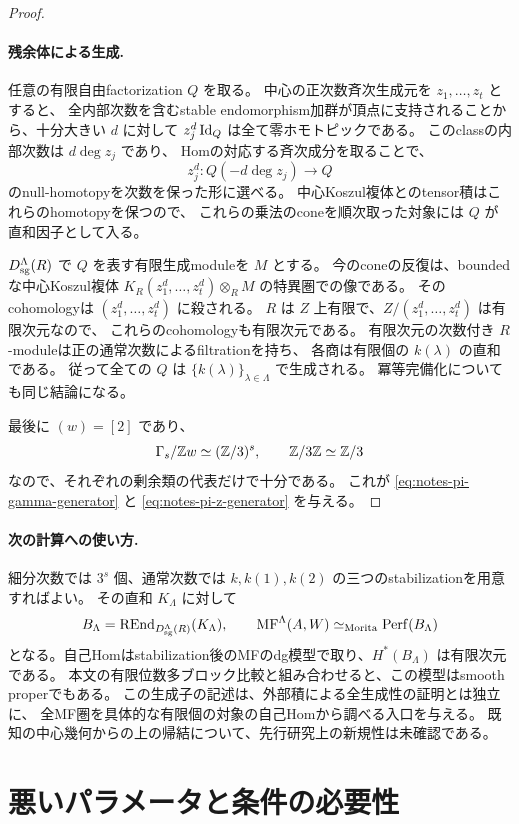 \begin{proof}
\paragraph{残余体による生成.}
任意の有限自由factorization \(Q\) を取る。
中心の正次数斉次生成元を \(z_1,\ldots,z_t\) とすると、
全内部次数を含むstable endomorphism加群が頂点に支持されることから、十分大きい \(d\) に対して
\(z_j^d\operatorname{Id}_Q\) は全て零ホモトピックである。
このclassの内部次数は \(d\deg z_j\) であり、
Homの対応する斉次成分を取ることで、
\[
 z_j^d:Q(-d\deg z_j)\longrightarrow Q
\]
のnull-homotopyを次数を保った形に選べる。
中心Koszul複体とのtensor積はこれらのhomotopyを保つので、
これらの乗法のconeを順次取った対象には \(Q\) が直和因子として入る。

\(D_{\mathrm{sg}}^\Lambda(R)\) で \(Q\) を表す有限生成moduleを \(M\) とする。
今のconeの反復は、boundedな中心Koszul複体
\(K_R(z_1^d,\ldots,z_t^d)\otimes_R M\) の特異圏での像である。
そのcohomologyは \((z_1^d,\ldots,z_t^d)\) に殺される。
\(R\) は \(Z\) 上有限で、\(Z/(z_1^d,\ldots,z_t^d)\) は有限次元なので、
これらのcohomologyも有限次元である。
有限次元の次数付き \(R\)-moduleは正の通常次数によるfiltrationを持ち、
各商は有限個の \(k(\lambda)\) の直和である。
従って全ての \(Q\) は \(\{k(\lambda)\}_{\lambda\in\Lambda}\) で生成される。
冪等完備化についても同じ結論になる。

最後に \((w)=[2]\) であり、
\[
 \Gamma_s/\mathbb Z w\simeq(\mathbb Z/3)^s,\qquad \mathbb Z/3\mathbb Z\simeq\mathbb Z/3
\]
なので、それぞれの剰余類の代表だけで十分である。
これが \eqref{eq:notes-pi-gamma-generator} と \eqref{eq:notes-pi-z-generator} を与える。
\end{proof}

\paragraph{次の計算への使い方.}
細分次数では \(3^s\) 個、通常次数では \(k,k(1),k(2)\) の三つのstabilizationを用意すればよい。
その直和 \(K_\Lambda\) に対して
\[
 B_\Lambda=\operatorname{REnd}_{D_{\mathrm{sg}}^\Lambda(R)}(K_\Lambda),\qquad
 \operatorname{MF}^\Lambda(A,W)\simeq_{\mathrm{Morita}}\operatorname{Perf}(B_\Lambda)
\]
となる。自己Homはstabilization後のMFのdg模型で取り、\(H^*(B_\Lambda)\) は有限次元である。
本文の有限位数多ブロック比較と組み合わせると、この模型はsmooth properでもある。
この生成子の記述は、外部積による全生成性の証明とは独立に、
全MF圏を具体的な有限個の対象の自己Homから調べる入口を与える。
既知の中心幾何からの上の帰結について、先行研究上の新規性は未確認である。

\section{悪いパラメータと条件の必要性}


